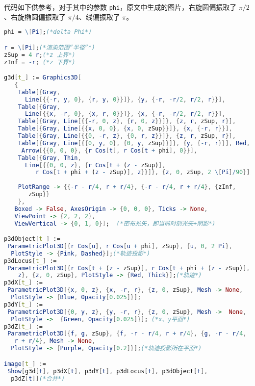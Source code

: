 
代码如下供参考，对于其中的参数 \verb`phi`，原文中生成的图片，右旋圆偏振取了 $\pi/2$、右旋椭圆偏振取了 $\pi/4$、线偏振取了 $\pi$。

\begin{lstlisting}[language=Mathematica]
phi = \[Pi];(*delta Phi*)

r = \[Pi];(*渲染范围“半径”*)
zSup = 4 r;(*z 上界*)
zInf = -r; (*z 下界*)

g3d[t_] := Graphics3D[
   {
    Table[{Gray, 
      Line[{{-r, y, 0}, {r, y, 0}}]}, {y, {-r, -r/2, r/2, r}}],
    Table[{Gray, 
      Line[{{x, -r, 0}, {x, r, 0}}]}, {x, {-r, -r/2, r/2, r}}],
    Table[{Gray, Line[{{-r, 0, z}, {r, 0, z}}]}, {z, r, zSup, r}],
    Table[{Gray, Line[{{x, 0, 0}, {x, 0, zSup}}]}, {x, {-r, r}}],
    Table[{Gray, Line[{{0, -r, z}, {0, r, z}}]}, {z, r, zSup, r}],
    Table[{Gray, Line[{{0, y, 0}, {0, y, zSup}}]}, {y, {-r, r}}], Red,
     Arrow[{{0, 0, 0}, {r Cos[t], r Cos[t + phi], 0}}],
    Table[{Gray, Thin, 
      Line[{{0, 0, z}, {r Cos[t + (z - zSup)], 
         r Cos[t + phi + (z - zSup)], z}}]}, {z, 0, zSup, 2 \[Pi]/90}],
    
    PlotRange -> {{-r - r/4, r + r/4}, {-r - r/4, r + r/4}, {zInf, 
       zSup}}
    }, 
   Boxed -> False, AxesOrigin -> {0, 0, 0}, Ticks -> None, 
   ViewPoint -> {2, 2, 2}, 
   ViewVertical -> {0, 1, 0}];  (*密布光矢，即当前时刻光矢+阴影*)

p3dObject[t_] := 
 ParametricPlot3D[{r Cos[u], r Cos[u + phi], zSup}, {u, 0, 2 Pi}, 
  PlotStyle -> {Pink, Dashed}];(*轨迹投影*)
p3dLocus[t_] := 
 ParametricPlot3D[{r Cos[t + (z - zSup)], r Cos[t + phi + (z - zSup)],
    z}, {z, 0, zSup}, PlotStyle -> {Red, Thick}];(*轨迹*)
p3dX[t_] := 
 ParametricPlot3D[{x, 0, z}, {x, -r, r}, {z, 0, zSup}, Mesh -> None, 
  PlotStyle -> {Blue, Opacity[0.025]}];
p3dY[t_] := 
 ParametricPlot3D[{0, y, z}, {y, -r, r}, {z, 0, zSup}, Mesh ->  None, 
  PlotStyle ->  {Green, Opacity[0.025]}]; (*x、y平面*)
p3dZ[t_] := 
 ParametricPlot3D[{f, g, zSup}, {f, -r - r/4, r + r/4}, {g, -r - r/4, 
   r + r/4}, Mesh -> None, 
  PlotStyle -> {Purple, Opacity[0.2]}];(*轨迹投影所在平面*)

image[t_] := 
 Show[g3d[t], p3dX[t], p3dY[t], p3dLocus[t], p3dObject[t], 
  p3dZ[t]](*合并*)
\end{lstlisting}